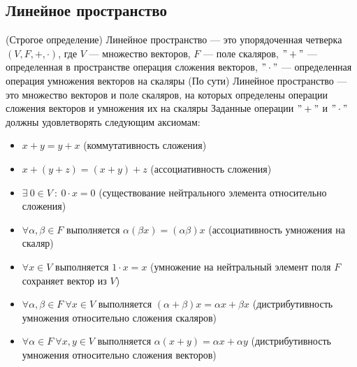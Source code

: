 \subsection{Линейное пространство}
    \begin{definition}
        (Строгое определение) Линейное пространство --- это упорядоченная четверка $(V, F, +, \cdot)$, где $V$ --- множество векторов, $F$ --- поле скаляров, $"+"$ --- определенная в пространстве операция сложения векторов, $"\cdot"$ --- определенная операция умножения векторов на скаляры
        \newline
        (По сути) Линейное пространство --- это множество векторов и поле скаляров, на которых определены операции сложения векторов и умножения их на скаляры
        \newline
        \newline
        Заданные операции $"+"$ и $"\cdot"$ должны удовлетворять следующим аксиомам:
        \begin{itemize}
            \item 
            $x + y = y + x$ (коммутативность сложения)
            \item
            $x + (y + z) = (x + y) + z$ (ассоциативность сложения)
            \item
            $\exists \: 0  \in V \: : \: 0 \cdot x = 0$ (существование нейтрального элемента относительно сложения)
            \item
            $\forall \alpha, \beta \in F$ выполняется $\alpha(\beta x) = (\alpha \beta)x$ (ассоциативность умножения на скаляр)
            \item
            $\forall x \in V$ выполняется $1 \cdot x = x$ (умножение на нейтральный элемент поля $F$ сохраняет вектор из $V$)
            \item
            $\forall \alpha, \beta \in F \ \forall x \in V$ выполняется $(\alpha + \beta)x = \alpha x + \beta x$ (дистрибутивность умножения относительно сложения скаляров)
            \item
            $\forall \alpha \in F \ \forall x, y \in V$ выполняется $\alpha(x + y) = \alpha x + \alpha y$ (дистрибутивность умножения относительно сложения векторов)
        \end{itemize}
    \end{definition}
\newpage
